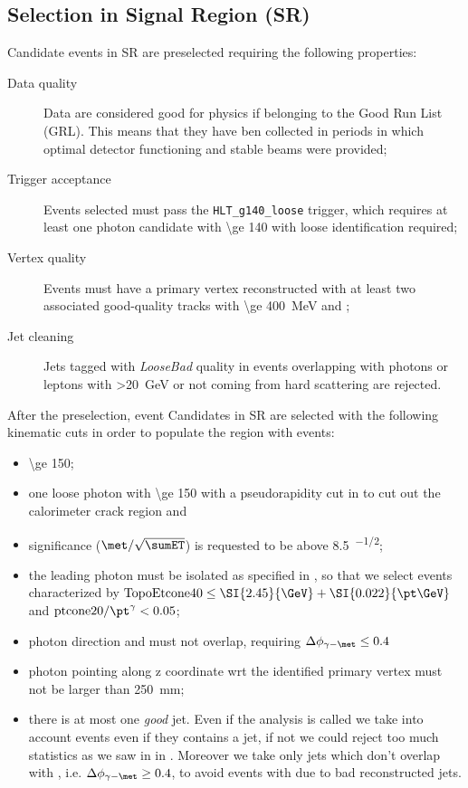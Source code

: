 \subsection{Selection in Signal Region (SR)}
Candidate events in SR are preselected requiring the following properties:
\begin{description}
\item [Data quality] Data are considered good for physics if belonging to the Good Run List (GRL). This means that they have ben collected in periods in which optimal detector functioning and stable beams were provided;
\item [Trigger acceptance] Events selected must pass the  \verb!HLT_g140_loose! trigger, which requires at least one photon candidate with \pt \SI{\ge 140}{\gev} with loose identification required;
\item [Vertex quality] Events must have a primary vertex reconstructed with at least two associated good-quality tracks with \pt \SI{\ge 400}{\MeV} and ;
\item [Jet cleaning] Jets tagged with {\itshape LooseBad} quality  in events overlapping with photons or leptons with \pt \SI{>20}{\GeV} or not coming from hard scattering are rejected.
\end{description}

After the preselection, event Candidates in SR are selected with the following kinematic cuts in order to populate the region with \gmet events:
\begin{itemize}
\item \met \SI{\ge 150}{\gev};
\item one loose photon with \pt \SI{\ge 150}{\gev} with a pseudorapidity cut in  to cut out the calorimeter crack region and 
\item \met significance ($\met/\sqrt{\sumET}$) is requested to be above \SI{8.5}{\gev^{-1/2}};
\item the leading photon must be isolated as specified in \Sect{\ref{sec:phisolation}}, so that we select events characterized by $ \text{TopoEtcone40} \le \SI{2.45}{\GeV} + \SI{0.022}{\pt\GeV}$ and $\text{ptcone20}/\pt^\gamma<0.05$;
\item photon direction and \met must not overlap, requiring $\Delta\phi_{\gamma - \met} \le 0.4$
\item photon pointing along z coordinate wrt the identified primary vertex must not be larger than \SI{250}{\mm};
\item there is at most one {\itshape good} jet. Even if the analysis is called \mph we take into account events even if they contains a jet, if not we could reject too much statistics as we saw in \Sect{\ref{sec:truth}} in \Fig{\ref{fig:validation}}. Moreover we take only jets which don't overlap with \met, i.e. $\Delta\phi_{\gamma -\met} \ge 0.4$, to avoid events with \met due to bad reconstructed jets.

\end{itemize}

